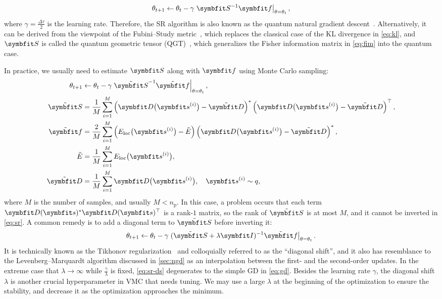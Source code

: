 \begin{equation}
\theta_{t + 1} \gets \theta_t - \gamma \left. \mS^{-1} \vf \right|_{\theta = \theta_t},
\label{eq:sr}
\end{equation}
where $\gamma = \frac{\Delta \tau}{2}$ is the learning rate. Therefore, the SR algorithm is also known as the quantum natural gradient descent~\cite{stokes2020quantum}. Alternatively, it can be derived from the viewpoint of the Fubini--Study metric~\cite{study1905kurzeste}, which replaces the classical case of the KL divergence in \cref{eq:kl}, and $\mS$ is called the quantum geometric tensor (QGT)~\cite{berry1989quantum}, which generalizes the Fisher information matrix in \cref{eq:fim} into the quantum case.

In practice, we usually need to estimate $\mS$ along with $\vf$ using Monte Carlo sampling:
\begin{align}
\theta_{t + 1} &\gets \theta_t - \gamma \left. \tilde{\mS}^{-1} \tilde{\vf} \right|_{\theta = \theta_t}, \\
\tilde{\mS} &= \frac{1}{M} \sum_{i = 1}^M
\left( \vD\big( \vs^{(i)} \big) - \tilde{\vD} \right)^*
\left( \vD\big( \vs^{(i)} \big) - \tilde{\vD} \right)^\transpose, \label{eq:qgt-mc} \\
\tilde{\vf} &= \frac{2}{M} \sum_{i = 1}^M
\left( E_\text{loc}\big( \vs^{(i)} \big) - \tilde{E} \right)
\left( \vD\big( \vs^{(i)} \big) - \tilde{\vD} \right)^*, \\
\tilde{E} &= \frac{1}{M} \sum_{i = 1}^M E_\text{loc}\big( \vs^{(i)} \big), \\
\tilde{\vD} &= \frac{1}{M} \sum_{i = 1}^M \vD\big( \vs^{(i)} \big), \quad
\vs^{(i)} \sim q,
\end{align}
where $M$ is the number of samples, and usually $M < n_\text{p}$. In this case, a problem occurs that each term $\vD(\vs)^* \vD(\vs)^\transpose$ is a rank-$1$ matrix, so the rank of $\tilde{\mS}$ is at most $M$, and it cannot be inverted in \cref{eq:sr}. A common remedy is to add a diagonal term to $\tilde{\mS}$ before inverting it:
\begin{equation}
\theta_{t + 1} \gets \theta_t - \gamma \left. (\tilde{\mS} + \lambda \mI)^{-1} \tilde{\vf} \right|_{\theta = \theta_t}.
\label{eq:sr-ds}
\end{equation}
It is technically known as the Tikhonov regularization~\cite{tikhonov1943stability} and colloquially referred to as the ``diagonal shift'', and it also has resemblance to the Levenberg--Marquardt algorithm discussed in \cref{sec:ngd} as an interpolation between the first- and the second-order updates. In the extreme case that $\lambda \to \infty$ while $\frac{\gamma}{\lambda}$ is fixed, \cref{eq:sr-ds} degenerates to the simple GD in \cref{eq:gd}. Besides the learning rate $\gamma$, the diagonal shift $\lambda$ is another crucial hyperparameter in VMC that needs tuning. We may use a large $\lambda$ at the beginning of the optimization to ensure the stability, and decrease it as the optimization approaches the minimum.

